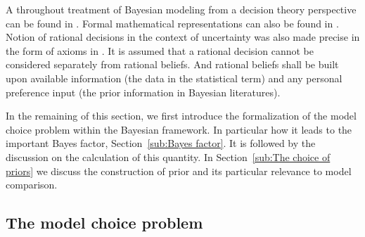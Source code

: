 A throughout treatment of Bayesian modeling from a decision theory perspective
can be found in \cite{Robert:2007tc}. Formal mathematical representations can
also be found in \cite[][sec.~5.1 and sec.~6.1]{Bernardo:1994vd}. Notion of
rational decisions in the context of uncertainty was also made precise in the
form of axioms in \cite{DeFinetti:1974tg,DeFinetti:1975ua}. It is assumed that
a rational decision cannot be considered separately from rational beliefs. And
rational beliefs shall be built upon available information (the data in the
statistical term) and any personal preference input (the prior information in
Bayesian literatures).

In the remaining of this section, we first introduce the formalization of the
model choice problem within the Bayesian framework. In particular how it leads
to the important Bayes factor, Section~\ref{sub:Bayes factor}. It is followed
by the discussion on the calculation of this quantity. In Section~\ref{sub:The
  choice of priors} we discuss the construction of prior and its particular
relevance to model comparison.

\subsection{The model choice problem}
\label{sub:The model choice problem}

